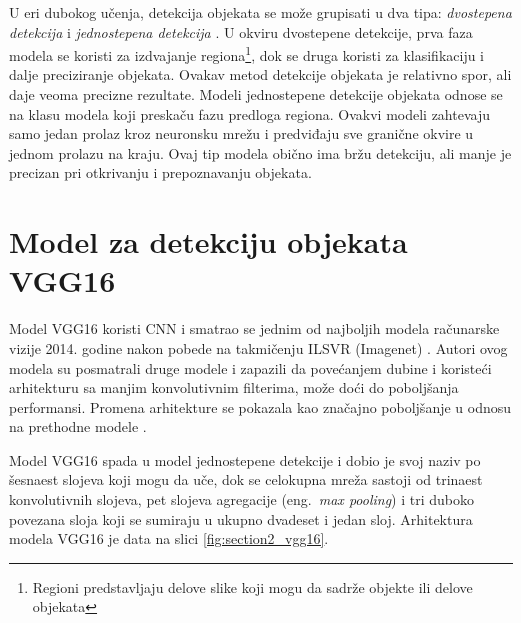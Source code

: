 \documentclass[12pt,oneside]{memoir}
\begin{document}
U eri dubokog učenja, detekcija objekata se može grupisati u dva tipa: \textit{dvostepena detekcija} i \textit{jednostepena detekcija}  \cite{zou2019object}.
U okviru dvostepene detekcije, prva faza modela se koristi za izdvajanje regiona\footnote{Regioni predstavljaju delove slike koji mogu da sadrže objekte ili delove objekata}, dok se druga koristi za klasifikaciju i dalje preciziranje objekata. Ovakav metod detekcije objekata je relativno spor, ali daje veoma precizne rezultate.
Modeli jednostepene detekcije objekata odnose se na klasu modela koji preskaču fazu predloga regiona. Ovakvi modeli zahtevaju samo jedan prolaz kroz neuronsku mrežu i predviđaju sve granične okvire u jednom prolazu na kraju. Ovaj tip modela obično ima bržu detekciju, ali manje je precizan pri otkrivanju i prepoznavanju objekata.


\section{Model za detekciju objekata VGG16}
Model VGG16 koristi CNN i smatrao se jednim od najboljih modela računarske vizije 2014. godine nakon pobede na takmičenju ILSVR (Imagenet) \cite{simonyan2014very}. Autori ovog modela su posmatrali druge modele i zapazili da povećanjem dubine i koristeći arhitekturu sa manjim konvolutivnim filterima, može doći do poboljšanja performansi. Promena arhitekture se pokazala kao značajno poboljšanje u odnosu na prethodne modele \cite{simonyan2014very}. 

Model VGG16 spada u model jednostepene detekcije i dobio je svoj naziv po šesnaest slojeva koji mogu da uče, dok se celokupna mreža sastoji od trinaest konvolutivnih slojeva, pet slojeva agregacije (eng.~\textit{max pooling}) i tri duboko povezana sloja koji se sumiraju u ukupno dvadeset i jedan sloj. Arhitektura modela VGG16 je data na slici \ref{fig:section2_vgg16}.
\end{document}

